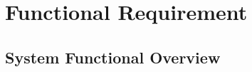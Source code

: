 \section{Functional Requirement}

\subsection{System Functional Overview}




% 

% 

% 

% 

% 

% 

% 

